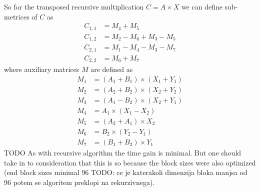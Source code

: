 \documentclass[a4paper,11pt]{article}
\begin{document}



So for the transposed recursive multiplication $C = A \times X$ we can define sub-metrices of $C$ as
\begin{align*}
C_{1,1} &= M_{4} + M_{5}\\
C_{1,2} &= M_{2} - M_{6} + M_{3} - M_{5} \\
C_{2,1} &= M_{1} - M_{4} - M_{3} - M_{7} \\
C_{2,2} &= M_{6} + M_{7}
\end{align*}
where auxiliary matrices $M$ are defined as
\begin{align*}
M_{1} &= (A_{1} + B_{1}) \times (X_{1} + Y_{1}) \\
M_{2} &= (A_{2} + B_{2}) \times (X_{2} + Y_{2}) \\
M_{3} &= (A_{1} - B_{2}) \times (X_{2} + Y_{1}) \\
M_{4} &= A_{1} \times (X_{1} - X_{2}) \\
M_{5} &= (A_{2} + A_{1}) \times X_{2} \\
M_{6} &= B_{2} \times (Y_{2} - Y_{1}) \\
M_{7} &= (B_{1} + B_{2}) \times Y_{1}
\end{align*}
TODO
As with recursive algorithm the time gain is minimal. 
But one should take in to consideration that this is so because the block sizes were also optimized (end block sizes minimal 96 TODO: ce je katerakoli dimenzija bloka manjsa od 96 potem se algoritem preklopi na rekurzivnega).
\end{document}
